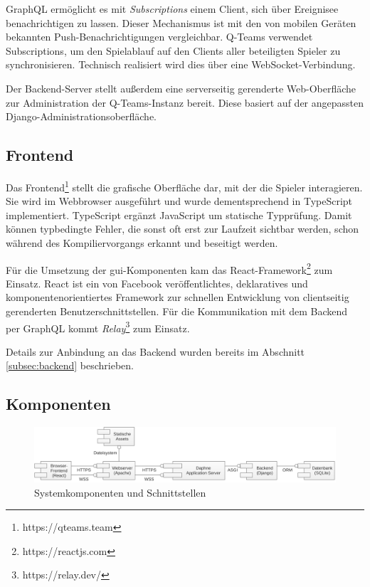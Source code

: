 \documentclass[a4paper,11pt,listof=numbered,glossary=totoc,parskip=half,toc=bib]{scrreprt}
\begin{document}
	GraphQL ermöglicht es mit \textit{Subscriptions} einem Client, sich über Ereignisee benachrichtigen zu lassen. Dieser Mechanismus ist mit den von mobilen Geräten bekannten Push-Benachrichtigungen vergleichbar. Q-Teams verwendet Subscriptions, um den Spielablauf auf den Clients aller beteiligten Spieler zu synchronisieren. Technisch realisiert wird dies über eine WebSocket-Verbindung.

	Der Backend-Server stellt außerdem eine serverseitig gerenderte Web-Oberfläche zur Administration der Q-Teams-Instanz bereit. Diese basiert auf der angepassten Django-Administrationsoberfläche.
	
	\subsection{Frontend}
	Das Frontend\footnote{https://qteams.team} stellt die grafische Oberfläche dar, mit der die Spieler interagieren. Sie wird im Webbrowser ausgeführt und wurde dementsprechend in TypeScript implementiert. TypeScript ergänzt JavaScript um statische Typprüfung. Damit können typbedingte Fehler, die sonst oft erst zur Laufzeit sichtbar werden, schon während des Kompiliervorgangs erkannt und beseitigt werden. 
	
	 Für die Umsetzung der \Gls{gui}-Komponenten kam das React-Framework\footnote{https://reactjs.com} zum Einsatz. React ist ein von Facebook veröffentlichtes, deklaratives und komponentenorientiertes Framework zur schnellen Entwicklung von clientseitig gerenderten Benutzerschnittstellen. Für die Kommunikation mit dem Backend per GraphQL kommt \textit{Relay}\footnote{https://relay.dev/} zum Einsatz.
	
	Details zur Anbindung an das Backend wurden bereits im Abschnitt \ref{subsec:backend} beschrieben.	
	
	\subsection{Komponenten}
	
	
	\begin{figure}
		\centering
		\includegraphics[width=\textwidth]{deployment}
		\caption{Systemkomponenten und Schnittstellen}
		\label{fig:components}
	\end{figure}
	
\end{document}
